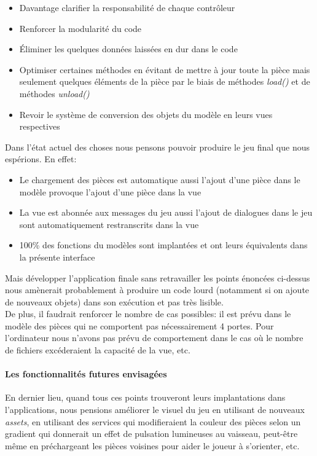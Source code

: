 \documentclass[./standalone.tex]{subfiles}
\begin{document}
\begin{itemize}
	\item Davantage clarifier la responsabilité de chaque contrôleur
	\item Renforcer la modularité du code
	\item Éliminer les quelques données laissées en dur dans le code
	\item Optimiser certaines méthodes en évitant de mettre à jour toute la pièce mais seulement quelques éléments de la pièce par le biais de méthodes \textit{load()} et de méthodes \textit{unload()}
	\item Revoir le système de conversion des objets du modèle en leurs vues\\ respectives\\
\end{itemize}

Dans l'état actuel des choses nous pensons pouvoir produire le jeu final que nous espérions. En effet:

\begin{itemize}
	\item Le chargement des pièces est automatique aussi l'ajout d'une pièce dans le modèle provoque l'ajout d'une pièce dans la vue
	\item La vue est abonnée aux messages du jeu aussi l'ajout de dialogues dans le jeu sont automatiquement restranscrits dans la vue
	\item 100\% des fonctions du modèles sont implantées et ont leurs équivalents dans la présente interface\\
\end{itemize}

Mais développer l'application finale sans retravailler les points énoncées ci-dessus nous amènerait probablement à produire un code lourd (notamment si on ajoute de nouveaux objets) dans son exécution et pas très lisible.\\

De plus, il faudrait renforcer le nombre de cas possibles: il est prévu dans le modèle des pièces qui ne comportent pas nécessairement 4 portes. Pour l'ordinateur nous n'avons pas prévu de comportement dans le cas où le nombre de fichiers excéderaient la capacité de la vue, etc.\\

\paragraph{Les fonctionnalités futures envisagées\\}
En dernier lieu, quand tous ces points trouveront leurs implantations dans l'applications, nous pensions améliorer le visuel du jeu en utilisant de nouveaux \textit{assets}, en utilisant des services qui modifieraient la couleur des pièces selon un gradient qui donnerait un effet de pulsation lumineuses au vaisseau, peut-être même en préchargeant les pièces voisines pour aider le joueur à s'orienter, etc.\\
\end{document}
